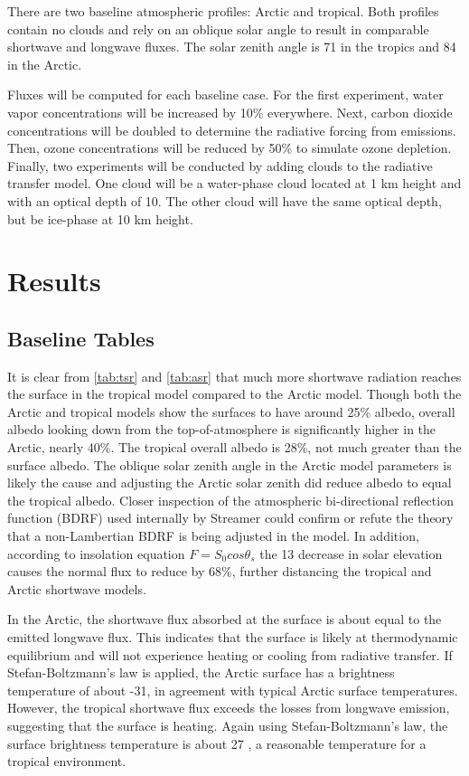 \documentclass[twocol]{ametsoc}
\begin{document}
There are two baseline atmospheric profiles: Arctic and tropical. Both profiles contain no clouds and rely on an oblique solar angle to result in comparable shortwave and longwave fluxes. The solar zenith angle is 71\degree{} in the tropics and 84\degree{} in the Arctic.

Fluxes will be computed for each baseline case. For the first experiment, water vapor concentrations will be increased by 10\% everywhere. Next, carbon dioxide concentrations will be doubled to determine the radiative forcing from emissions. Then, ozone concentrations will be reduced by 50\% to simulate ozone depletion. Finally, two experiments will be conducted by adding clouds to the radiative transfer model. One cloud will be a water-phase cloud located at 1 km height and with an optical depth of 10. The other cloud will have the same optical depth, but be ice-phase at 10 km height.

\section{Results}

\subsection*{Baseline Tables}

It is clear from \autoref{tab:tsr} and \autoref{tab:asr} that much more shortwave radiation reaches the surface in the tropical model compared to the Arctic model. Though both the Arctic and tropical models show the surfaces to have around 25\% albedo, overall albedo looking down from the top-of-atmosphere is significantly higher in the Arctic, nearly 40\%. The tropical overall albedo is 28\%, not much greater than the surface albedo. The oblique solar zenith angle in the Arctic model parameters is likely the cause and adjusting the Arctic solar zenith did reduce albedo to equal the tropical albedo. Closer inspection of the atmospheric bi-directional reflection function (BDRF) used internally by Streamer could confirm or refute the theory that a non-Lambertian BDRF is being adjusted in the model. In addition, according to insolation equation $F = S_0 cos \theta_s$ \citep[p.~51]{petty:2008} the 13\degree{} decrease in solar elevation causes the normal flux to reduce by 68\%, further distancing the tropical and Arctic shortwave models.

In the Arctic, the shortwave flux absorbed at the surface is about equal to the emitted longwave flux. This indicates that the surface is likely at thermodynamic equilibrium and will not experience heating or cooling from radiative transfer. If Stefan-Boltzmann’s law is applied, the Arctic surface has a brightness temperature of about -31, in agreement with typical Arctic surface temperatures. However, the tropical shortwave flux exceeds the losses from longwave emission, suggesting that the surface is heating. Again using Stefan-Boltzmann’s law, the surface brightness temperature is about 27 , a reasonable temperature for a tropical environment.
\end{document}
